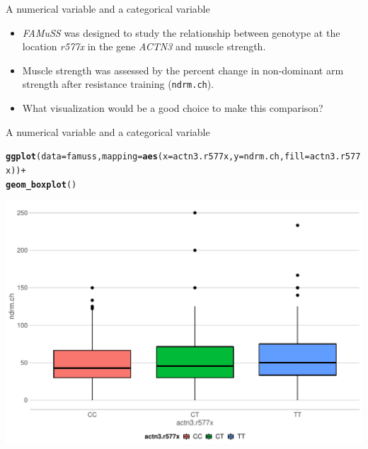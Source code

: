 \documentclass[10pt]{beamer}\usepackage[]{graphicx}\usepackage[]{color}
\makeatletter
\def\maxwidth{ %
  \ifdim\Gin@nat@width>\linewidth
    \linewidth
  \else
    \Gin@nat@width
  \fi
}
\newcommand{\hlopt}[1]{\textcolor[rgb]{0,0,0}{#1}}%
\newcommand{\hlstd}[1]{\textcolor[rgb]{0.345,0.345,0.345}{#1}}%
\newcommand{\hlkwc}[1]{\textcolor[rgb]{0.333,0.667,0.333}{#1}}%
\newcommand{\hlkwd}[1]{\textcolor[rgb]{0.737,0.353,0.396}{\textbf{#1}}}%
\newenvironment{kframe}{%
 \def\at@end@of@kframe{}%
 \ifinner\ifhmode%
  \def\at@end@of@kframe{\end{minipage}}%
  \begin{minipage}{\columnwidth}%
 \fi\fi%
 \def\FrameCommand##1{\hskip\@totalleftmargin \hskip-\fboxsep
 \colorbox{shadecolor}{##1}\hskip-\fboxsep
     \hskip-\linewidth \hskip-\@totalleftmargin \hskip\columnwidth}%
 \MakeFramed {\advance\hsize-\width
   \@totalleftmargin\z@ \linewidth\hsize
   \@setminipage}}%
 {\par\unskip\endMakeFramed%
 \at@end@of@kframe}
\newenvironment{knitrout}{}{} %
\makeatother
\begin{document}
\begin{frame}{A numerical variable and a categorical variable}
	\protect\hypertarget{a-numerical-variable-and-a-categorical-variable}{}
	
	\begin{itemize}
		\item \emph{FAMuSS} was designed to study the relationship between genotype at
	the location \emph{r577x} in the gene \emph{ACTN3} and muscle strength.
	
	\item Muscle strength was assessed by the percent change in non-dominant arm
	strength after resistance training (\texttt{ndrm.ch}).
	
	\item What visualization would be a good choice to make this comparison?
	\end{itemize}
	
\end{frame}


\begin{frame}[fragile]{A numerical variable and a categorical variable}
	\protect\hypertarget{a-numerical-variable-and-a-categorical-variable-1}{}
	
	\scriptsize
	
	\scriptsize
	

	
\begin{knitrout}\scriptsize
{}\color{fgcolor}\begin{kframe}
\begin{alltt}
\hlkwd{ggplot}\hlstd{(}\hlkwc{data} \hlstd{= famuss,} \hlkwc{mapping} \hlstd{=} \hlkwd{aes}\hlstd{(}\hlkwc{x} \hlstd{= actn3.r577x,} \hlkwc{y} \hlstd{= ndrm.ch,} \hlkwc{fill} \hlstd{= actn3.r577x))} \hlopt{+}
  \hlkwd{geom_boxplot}\hlstd{()}
\end{alltt}
\end{kframe}

{\centering \includegraphics[width=\maxwidth]{figure/box-1-1} 

}



\end{knitrout}
	
	
	\normalsize
	
\end{frame}
\end{document}
